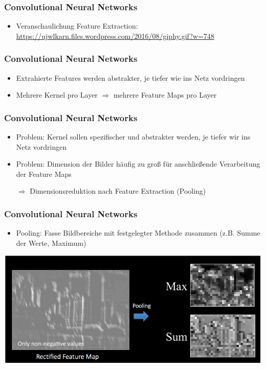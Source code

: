 \documentclass[12pt,utf8]{beamer}
\begin{document}
	\begin{frame}
		\frametitle{Convolutional Neural Networks}
		\begin{itemize}
			\item Veranschaulichung Feature Extraction:
			\url{https://ujwlkarn.files.wordpress.com/2016/08/giphy.gif?w=748}
		\end{itemize}
	\end{frame}
	
	\begin{frame}
		\frametitle{Convolutional Neural Networks}
		\begin{itemize}
			\item Extrahierte Features werden abstrakter, je tiefer wie ins Netz vordringen
			\item Mehrere Kernel pro Layer $\Rightarrow$ mehrere Feature Maps pro Layer
		\end{itemize}
	\end{frame}
	
	\begin{frame}
		\frametitle{Convolutional Neural Networks}
		\begin{itemize}
			\item Problem: Kernel sollen spezifischer und abstrakter werden, je tiefer wir ins Netz vordringen
			\item Problem: Dimension der Bilder häufig zu groß für anschließende Verarbeitung der Feature Maps
			\item[$\Rightarrow$] Dimensionsreduktion nach Feature Extraction (Pooling)
		\end{itemize}
	\end{frame}
	
	\begin{frame}
		\frametitle{Convolutional Neural Networks}
		\begin{itemize}
			\item Pooling: Fasse Bildbereiche mit festgelegter Methode zusammen (z.B. Summe der Werte, Maximum)
		\end{itemize}
	\end{frame}
	
	\begin{frame}
		\centering
		\includegraphics[scale=0.8]{resources/pooling.png}
		
		\cite{pooling}
	\end{frame}
	
\end{document}
